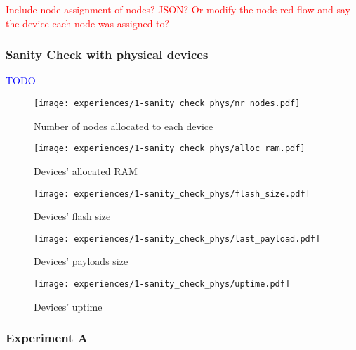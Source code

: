 \textcolor{red}{Include node assignment of nodes? JSON? Or modify the node-red flow and say the device each node was assigned to?}


\subsubsection{Sanity Check with physical devices}

\textcolor{blue}{TODO}

\begin{figure}[h]
\centering
\texttt{[image: experiences/1-sanity\_check\_phys/nr\_nodes.pdf]}
\caption[Number of nodes allocated to each device]{Number of nodes allocated to each device}\label{fig:sanity_check_phys_nr_nodes}
\end{figure}
    
    
\begin{figure}[h]
\centering
\texttt{[image: experiences/1-sanity\_check\_phys/alloc\_ram.pdf]}
\caption[Devices' allocated RAM]{Devices' allocated RAM}\label{fig:sanity_check_phys_alloc_ram}
\end{figure}

\begin{figure}[H]
\centering
\texttt{[image: experiences/1-sanity\_check\_phys/flash\_size.pdf]}
\caption[Devices' flash size]{Devices' flash size}\label{fig:sanity_check_phys_flash_size}
\end{figure}

\begin{figure}[h]
\centering
\texttt{[image: experiences/1-sanity\_check\_phys/last\_payload.pdf]}
\caption[Devices' payloads size]{Devices' payloads size}\label{fig:sanity_check_phys_last_payload}
\end{figure}

\begin{figure}[h]
\centering
\texttt{[image: experiences/1-sanity\_check\_phys/uptime.pdf]}
\caption[Devices' uptime]{Devices' uptime}\label{fig:sanity_check_phys_uptime}
\end{figure}


\subsubsection{Experiment A}

